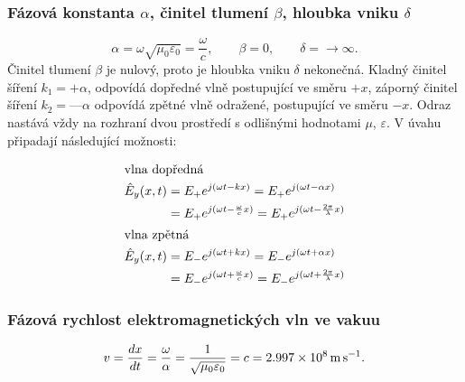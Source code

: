 {      \subsubsection{Fázová konstanta \(\alpha\), činitel tlumení \(\beta\), hloubka 
                         vniku \(\delta\)}
        \begin{equation}\label{ES:eq_elmagp37}
          \alpha = \omega\sqrt{\mu_0\varepsilon_0} = \frac{\omega}{c}, \qquad 
          \beta  = 0,                                                  \qquad
           \delta = \rightarrow\infty.
        \end{equation}
        Činitel tlumení \(\beta\) je nulový, proto je hloubka vniku \(\delta\) nekonečná. Kladný 
        činitel šíření \(k_1 = +\alpha\), odpovídá dopředné vlně postupující ve směru \(+x\), 
        záporný činitel šíření \(k_2 = —\alpha\) odpovídá zpětné vlně odražené, postupující ve 
        směru \(-x\). Odraz nastává vždy na rozhraní dvou prostředí s odlišnými hodnotami \(\mu\), 
        \(\varepsilon\). V úvahu připadají následující možnosti:
        
        \begin{subequations}
          \begin{align}
            \shortintertext{vlna dopředná}
            \hat{E}_y(x,t) 
              &= E_+e^{j(\omega t - kx)} 
               = E_+e^{j(\omega t - \alpha x)}                    \nonumber \\
              &= E_+e^{j(\omega t - \frac{\omega}{c}x)}
               = E_+e^{j(\omega t - \frac{2\pi}{\lambda}x)}       \label{ES:eq_elmagp38a}   \\
            \shortintertext{vlna zpětná}
            \hat{E}_y(x,t) 
              &= E_-e^{j(\omega t + kx)}
               = E_-e^{j(\omega t + \alpha x)}                    \nonumber \\
              &= E_-e^{j(\omega t + \frac{\omega}{c}x)} 
               = E_-e^{j(\omega t + \frac{2\pi}{\lambda}x)}       \label{ES:eq_elmagp38b}
          \end{align}
        \end{subequations}

      \subsubsection{Fázová rychlost elektromagnetických vln ve vakuu}
        \begin{equation}\label{ES:eq_elmagp39}
          v = \dfrac{d x}{d t} = \frac{\omega}{\alpha} = \frac{1}{\sqrt{\mu_0\varepsilon_0}}
            = c 
            = \SI{2.997e8}{\meter\per\second}.
        \end{equation}

}
